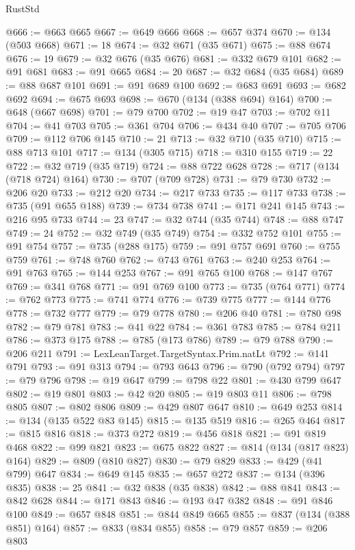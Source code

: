 \begin{lexlean}{RustStd}
\begin{coremodule}
{\begin{coremodule}
{{{{{{{{{{{{{{{{{{{{{{{{{{{{{{{{@666 := @663 @665
@667 := @649 @666
@668 := @657 @374
@670 := @134 (@503 @668)
@671 := 18
@674 := @32 @671 (@35 @671)
@675 := @88 @674
@676 := 19
@679 := @32 @676 (@35 @676)
@681 := @332 @679 @101
@682 := @91 @681
@683 := @91 @665
@684 := 20
@687 := @32 @684 (@35 @684)
@689 := @88 @687 @101
@691 := @91 @689 @100
@692 := @683 @691
@693 := @682 @692
@694 := @675 @693
@698 := @670 (@134 (@388 @694) @164)
@700 := @648 (@667 @698)
@701 := @79 @700
@702 := @19 @47
@703 := @702 @11
@704 := @41 @703
@705 := @361 @704
@706 := @434 @40
@707 := @705 @706
@709 := @112 @706 @145
@710 := 21
@713 := @32 @710 (@35 @710)
@715 := @88 @713 @101
@717 := @134 (@305 @715)
@718 := @310 @155
@719 := 22
@722 := @32 @719 (@35 @719)
@724 := @88 @722 @628
@728 := @717 (@134 (@718 @724) @164)
@730 := @707 (@709 @728)
@731 := @79 @730
@732 := @206 @20
@733 := @212 @20
@734 := @217 @733
@735 := @117 @733
@738 := @735 (@91 @655 @188)
@739 := @734 @738
@741 := @171 @241 @145
@743 := @216 @95 @733
@744 := 23
@747 := @32 @744 (@35 @744)
@748 := @88 @747
@749 := 24
@752 := @32 @749 (@35 @749)
@754 := @332 @752 @101
@755 := @91 @754
@757 := @735 (@288 @175)
@759 := @91 @757 @691
@760 := @755 @759
@761 := @748 @760
@762 := @743 @761
@763 := @240 @253
@764 := @91 @763
@765 := @144 @253
@767 := @91 @765 @100
@768 := @147 @767
@769 := @341 @768
@771 := @91 @769 @100
@773 := @735 (@764 @771)
@774 := @762 @773
@775 := @741 @774
@776 := @739 @775
@777 := @144 @776
@778 := @732 @777
@779 := @79 @778
@780 := @206 @40
@781 := @780 @98
@782 := @79 @781
@783 := @41 @22
@784 := @361 @783
@785 := @784 @211
@786 := @373 @175
@788 := @785 (@173 @786)
@789 := @79 @788
@790 := @206 @211
@791 := LexLeanTarget.TargetSyntax.Prim.natLt
@792 := @141 @791
@793 := @91 @313
@794 := @793 @643
@796 := @790 (@792 @794)
@797 := @79 @796
@798 := @19 @647
@799 := @798 @22
@801 := @430 @799 @647
@802 := @19 @801
@803 := @42 @20
@805 := @19 @803 @11
@806 := @798 @805
@807 := @802 @806
@809 := @429 @807 @647
@810 := @649 @253
@814 := @134 (@135 @522 @83 @145)
@815 := @135 @519
@816 := @265 @464
@817 := @815 @816
@818 := @373 @272
@819 := @456 @818
@821 := @91 @819 @468
@822 := @99 @821
@823 := @675 @822
@827 := @814 (@134 (@817 @823) @164)
@829 := @809 (@810 @827)
@830 := @79 @829
@833 := @429 (@41 @799) @647
@834 := @649 @145
@835 := @657 @272
@837 := @134 (@396 @835)
@838 := 25
@841 := @32 @838 (@35 @838)
@842 := @88 @841
@843 := @842 @628
@844 := @171 @843
@846 := @193 @47 @382
@848 := @91 @846 @100
@849 := @657 @848
@851 := @844 @849 @665
@855 := @837 (@134 (@388 @851) @164)
@857 := @833 (@834 @855)
@858 := @79 @857
@859 := @206 @803
}}}}}}}}}}}}}}}}}}}}}}}}}}}}}}}}
\end{coremodule}}
\end{coremodule}
\end{lexlean}
